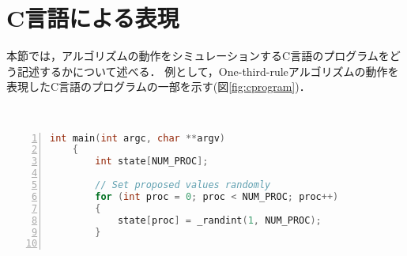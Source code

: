 \documentclass[technicalreport]{ieicej}
\theoremstyle{plain}
\begin{document}


\section{C言語による表現}\label{sec:clang}

本節では，アルゴリズムの動作をシミュレーションするC言語のプログラムをどう記述するかについて述べる．
例として，One-third-ruleアルゴリズムの動作を表現したC言語のプログラムの一部を示す(図\ref{fig:cprogram})．


\begin{figure*}
	\centering　
	\begin{minipage}{0.8\textwidth}
	{\scriptsize
\begin{lstlisting}[language=c,numbers=left]
    int main(int argc, char **argv)
    {
        int state[NUM_PROC];
                
        // Set proposed values randomly
        for (int proc = 0; proc < NUM_PROC; proc++)
        {
            state[proc] = _randint(1, NUM_PROC);
        }
        

\end{lstlisting}}
\end{minipage}
\end{figure*}
\end{document}
